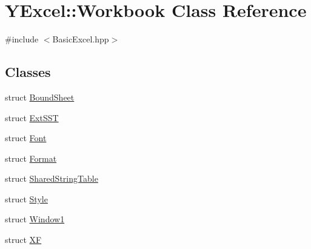\hypertarget{class_y_excel_1_1_workbook}{}\section{Y\+Excel\+:\+:Workbook Class Reference}
\label{class_y_excel_1_1_workbook}


{\ttfamily \#include $<$Basic\+Excel.\+hpp$>$}

\subsection*{Classes}
\begin{DoxyCompactItemize}
\item 
struct \hyperlink{struct_y_excel_1_1_workbook_1_1_bound_sheet}{Bound\+Sheet}
\item 
struct \hyperlink{struct_y_excel_1_1_workbook_1_1_ext_s_s_t}{Ext\+S\+S\+T}
\item 
struct \hyperlink{struct_y_excel_1_1_workbook_1_1_font}{Font}
\item 
struct \hyperlink{struct_y_excel_1_1_workbook_1_1_format}{Format}
\item 
struct \hyperlink{struct_y_excel_1_1_workbook_1_1_shared_string_table}{Shared\+String\+Table}
\item 
struct \hyperlink{struct_y_excel_1_1_workbook_1_1_style}{Style}
\item 
struct \hyperlink{struct_y_excel_1_1_workbook_1_1_window1}{Window1}
\item 
struct \hyperlink{struct_y_excel_1_1_workbook_1_1_x_f}{X\+F}
\end{DoxyCompactItemize}
